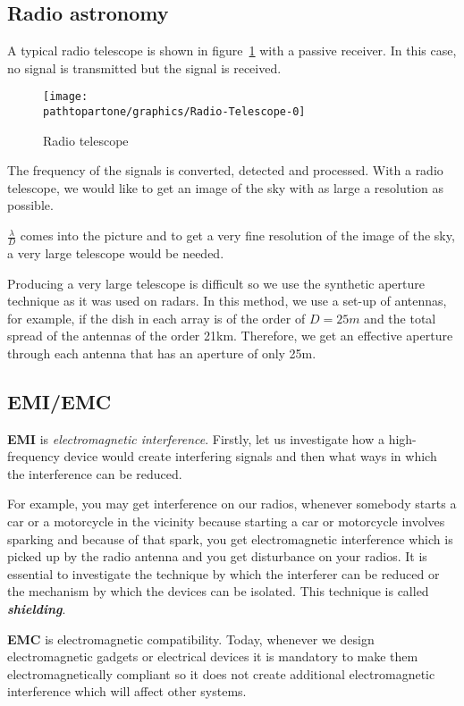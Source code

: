\subsection{Radio astronomy} 

A typical radio telescope is shown in figure~\ref{fig:radiotelescope0} with a passive receiver. In this case, no signal is transmitted but the signal is received.
\begin{figure}[h]
\centering
\texttt{[image: \\pathtopartone/graphics/Radio-Telescope-0]}
\caption{Radio telescope}
\label{fig:radiotelescope0}
\end{figure}

The frequency of the signals is converted, detected and processed. With a radio telescope, we would like to get an image of the sky with as large a resolution as possible.

$\frac{\lambda}{D}$ comes into the picture and to get a very fine resolution of the image of the sky, a very large telescope would be needed.


Producing a very large telescope is difficult so we use the synthetic aperture technique as it was used on radars. In this method, we use a set-up of antennas, for example, if the dish in each array is of the order of $ D = 25m $ and the total spread of the antennas of the order 21km. Therefore, we get an effective aperture through each antenna that has an aperture of only 25m.

\subsection{EMI/EMC}

\textbf{EMI} is \textit{electromagnetic interference}. Firstly, let us investigate how a high-frequency device would create interfering signals and then what ways in which the interference can be reduced.

For example, you may get interference on our radios, whenever somebody starts a car or a motorcycle in the vicinity because starting a car or motorcycle involves sparking and because of that spark, you get electromagnetic interference which is picked up by the radio antenna and you get disturbance on your radios. It is essential to investigate the technique by which the interferer can be reduced or the mechanism by which the devices can be isolated. This technique is called \textit{\textbf{shielding}}.

\textbf{EMC} is electromagnetic compatibility. Today, whenever we design electromagnetic gadgets or electrical devices it is mandatory to make them electromagnetically compliant so it does not create additional electromagnetic interference which will affect other systems.


